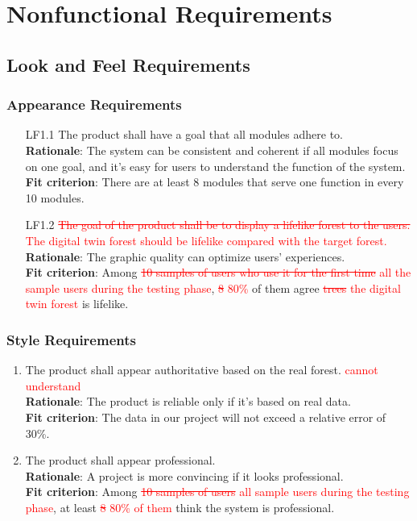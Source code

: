 \documentclass{article}
\begin{document}



\section{Nonfunctional Requirements}
\subsection{Look and Feel Requirements}
\subsubsection{Appearance Requirements}
\begin{enumerate}
    \item[LF1.1] The product shall have a goal that all modules adhere to. \\
    \textbf{Rationale}: The system can be consistent and coherent if all modules focus on one goal, and
     it's easy for users to understand the function of the system.\\
    \textbf{Fit criterion}:  There are at least 8 modules that serve one function in every 10 modules.
   
    \item[LF1.2] \textcolor{red}{\st{The goal of the product shall be to display a lifelike forest to
     the users.} The digital twin forest should be lifelike compared with the target
     forest.}\\
    \textbf{Rationale}: The graphic quality can optimize users' experiences.\\
    \textbf{Fit criterion}: Among \textcolor{red}{\st{10 samples of users who use it for the first
     time} all the sample users during the testing phase}, \textcolor{red}{\st{8} 80\%} of them agree
      \textcolor{red}{\st{trees} the digital twin forest} is lifelike.
\end{enumerate}
\subsubsection{Style Requirements}
\begin{enumerate}[LF2.1]
    \item The product shall appear authoritative based on the real forest. \textcolor{red}{cannot
    understand}\\
    \textbf{Rationale}: The product is reliable only if it's based on real data.\\
    \textbf{Fit criterion}: The data in our project will not exceed a relative error of 30\%.
    
    \item The product shall appear professional.\\
    \textbf{Rationale}: A project is more convincing if it looks professional.\\
    \textbf{Fit criterion}: Among \textcolor{red}{\st{10 samples of users} all sample users during the 
    testing phase}, at least \textcolor{red}{\st{8} 80\% of them} think the system is professional.
\end{enumerate}
\end{document}
